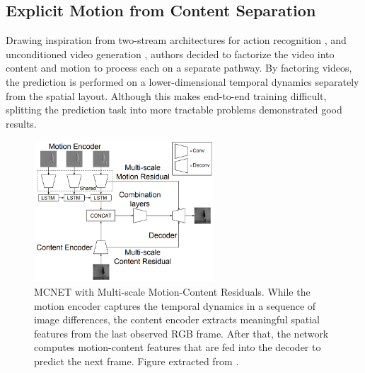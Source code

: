 \subsection{Explicit Motion from Content Separation}
\label{subsc:two_stream}
Drawing inspiration from two-stream architectures for action recognition \cite{Simonyan2014}, and unconditioned video generation \cite{Tulyakov2018}, authors decided to factorize the video into content and motion to process each on a separate pathway. By factoring videos, the prediction is performed on a lower-dimensional temporal dynamics separately from the spatial layout. Although this makes end-to-end training difficult, splitting the prediction task into more tractable problems demonstrated good results. 
\begin{figure}[!tbp]
	\centering
	\includegraphics[width=0.6\textwidth]{Figures/videoprediction/methods/mcnet.png}
	\caption{\acf{MCNET} with Multi-scale Motion-Content Residuals. While the motion encoder captures the temporal dynamics in a sequence of image differences, the content encoder extracts meaningful spatial features from the last observed RGB frame. After that, the network computes motion-content features that are fed into the decoder to predict the next frame. Figure extracted from \cite{Villegas2017a}.}
	\label{fig:mcnet}
\end{figure}

